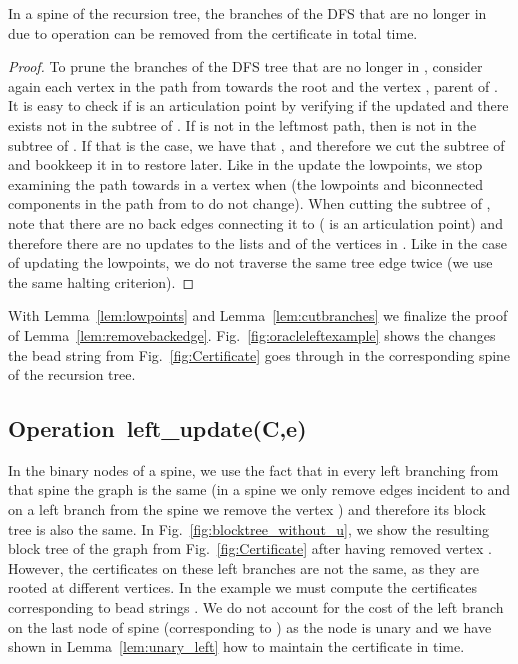 \begin{lemma}
	In a spine of the recursion tree, the branches of the DFS that
	are no longer in  due to operation
	 can be removed from the certificate in
	 total time.
	\label{lem:cutbranches}
\end{lemma}
\begin{proof}
	To prune the branches of the DFS tree that are no longer in
        , consider again each vertex  in the path from 
        towards the root  and the vertex , parent of . It is
        easy to check if  is an articulation point by verifying if
        the updated  and there
        exists  not in the subtree of . If  is not in the
        leftmost path, then  is not in the subtree of . If that
        is the case, we have that , and therefore we
        cut the subtree of  and bookkeep it in  to restore
        later. Like in the update the lowpoints, we stop examining the
        path  towards  in a vertex  when
         (the lowpoints and
        biconnected components in the path from  to  do not
        change).  When cutting the subtree of , note that there are
        no back edges connecting it to  ( is an
        articulation point) and therefore there are no updates to the
        lists  and  of the vertices in .  Like in the
        case of updating the lowpoints, we do not traverse the same
        tree edge twice (we use the same halting criterion). 
\end{proof}

With Lemma~\ref{lem:lowpoints} and Lemma~\ref{lem:cutbranches} we
finalize the proof of Lemma~\ref{lem:removebackedge}. 
Fig.~\ref{fig:oracleleftexample} shows the changes the bead string 
from Fig.~\ref{fig:Certificate} goes through in the corresponding spine
of the recursion tree.


\subsection{Operation~left\_update(C,e)} 
In the binary nodes of a spine, we use
the fact that in every left branching from that spine the graph is
the same (in a spine we only remove edges incident to  and on a
left branch from the spine we remove the vertex ) and therefore its
block tree is also the same. In Fig.~\ref{fig:blocktree_without_u},
we show the resulting block tree of the graph from
Fig.~\ref{fig:Certificate} after having removed vertex . However,
the certificates on these left branches are not the same, as they are
rooted at different vertices. In the example we must compute the
certificates  corresponding to bead strings . We do not account for the cost of the left
branch on the last node of spine (corresponding to ) as the
node is unary and we have shown in Lemma~\ref{lem:unary_left} how to
maintain the certificate in  time.

